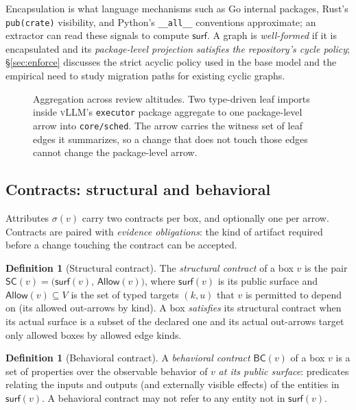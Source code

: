 \documentclass[sigconf,review,anonymous]{acmart}
\theoremstyle{plain}
\theoremstyle{definition}
\newtheorem{definition}[theorem]{Definition}
\begin{document}
Encapsulation is what language mechanisms such as Go internal packages, Rust's
\texttt{pub(crate)} visibility, and Python's \texttt{\_\_all\_\_} conventions
approximate; an extractor can read these signals to compute
$\mathsf{surf}$. A graph is \emph{well-formed} if it is encapsulated and its
\emph{package-level projection satisfies the repository's cycle policy};
\S\ref{sec:enforce} discusses the strict acyclic policy used in the base model
and the empirical need to study migration paths for existing cyclic graphs.

\begin{figure}[t]
\centering

\caption{Aggregation across review altitudes. Two type-driven leaf imports
inside \textsc{vLLM}'s \texttt{executor} package aggregate to one package-level
arrow into \texttt{core/sched}. The arrow carries the witness set of leaf edges
it summarizes, so a change that does not touch those edges cannot change the
package-level arrow.}
\label{fig:aggregation}
\end{figure}

\subsection{Contracts: structural and behavioral}\label{sec:contracts}

Attributes $\sigma(v)$ carry two contracts per box, and optionally one per
arrow. Contracts are paired with \emph{evidence obligations}: the kind of
artifact required before a change touching the contract can be accepted.

\begin{definition}[Structural contract]
The \emph{structural contract} of a box $v$ is the pair
$\mathsf{SC}(v)=\big(\mathsf{surf}(v),\,\mathsf{Allow}(v)\big)$, where
$\mathsf{surf}(v)$ is its public surface and $\mathsf{Allow}(v)\subseteq V$ is
the set of typed targets $(k,u)$ that $v$ is permitted to depend on (its
allowed out-arrows by kind). A box \emph{satisfies} its structural contract when
its actual surface is a subset of the declared one and its actual out-arrows
target only allowed boxes by allowed edge kinds.
\end{definition}

\begin{definition}[Behavioral contract]\label{def:bc}
A \emph{behavioral contract} $\mathsf{BC}(v)$ of a box $v$ is a set of
properties over the observable behavior of $v$ \emph{at its public surface}:
predicates relating the inputs and outputs (and externally visible effects) of
the entities in $\mathsf{surf}(v)$. A behavioral contract may not refer to any
entity not in $\mathsf{surf}(v)$.
\end{definition}
\end{document}
